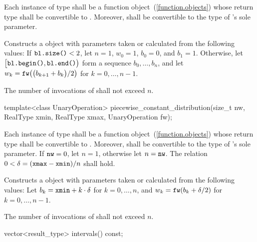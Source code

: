\begin{itemdescr}
\pnum\requires
 Each instance of type 
 shall be a function object~(\ref{function.objects})
 whose return type shall be convertible to .
 Moreover,
  shall be convertible
 to the type of 's sole parameter.

\pnum\effects Constructs a  object
 with parameters taken or calculated
 from the following values:
 If $\texttt{bl.size()} < 2$,
 let $n = 1$,
     $ w_0 = 1 $,
     $ b_0 = 0 $,
 and $ b_1 = 1 $.
 Otherwise,
 let $\bigl[\texttt{bl.begin()}, \texttt{bl.end()}\bigr)$
 form a sequence $ b_0, \ldots, b_n $,
 and
 let $ w_k = \texttt{fw}\bigl(\bigl(b_{k+1} + b_k\bigr) / 2\bigr) $
 for $ k = 0, \ldots, n\!-\!1 $.

\pnum\complexity
 The number of invocations of  shall not exceed $n$.
\end{itemdescr}


%
\begin{itemdecl}
template<class UnaryOperation>
 piecewise_constant_distribution(size_t nw, RealType xmin, RealType xmax, UnaryOperation fw);
\end{itemdecl}

\begin{itemdescr}
\pnum\requires
 Each instance of type 
 shall be a function object~(\ref{function.objects})
 whose return type shall be convertible to .
 Moreover,
  shall be convertible
 to the type of 's sole parameter.
 If $ \texttt{nw} = 0 $, let $ n = 1 $, otherwise let $n = \texttt{nw}$.
 The relation $ 0 < \delta = (\texttt{xmax} - \texttt{xmin}) / n $
 shall hold.

\pnum\effects Constructs a  object
 with parameters taken or calculated
 from the following values:
 Let $ b_k = \texttt{xmin} + k \cdot \delta $ for $ k = 0, \ldots, n $,
 and $ w_k = \texttt{fw}(b_k + \delta / 2) $ for $ k = 0, \ldots, n\!-\!1 $.

\pnum\complexity
 The number of invocations of  shall not exceed $n$.
\end{itemdescr}

%
\begin{itemdecl}
vector<result_type> intervals() const;
\end{itemdecl}

